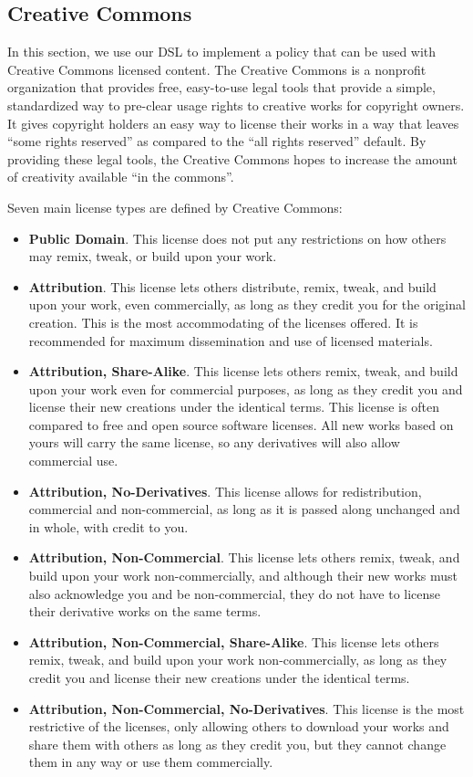 \subsection{Creative Commons}\label{sec:model-cc}
In this section, we use our DSL to implement a policy that can be used with
Creative Commons licensed content.  The Creative Commons is a nonprofit
organization that provides free, easy-to-use legal tools that provide a simple,
standardized way to pre-clear usage rights to creative works for copyright
owners.  It gives copyright holders an easy way to license their works in a way
that leaves ``some rights reserved'' as compared to the ``all rights reserved''
default.  By providing these legal tools, the Creative Commons hopes to
increase the amount of creativity available ``in the commons''.

Seven main license types are defined by Creative Commons:

\begin{itemize}
\item \textbf{Public Domain}. This license does not put any restrictions on how others may remix, tweak, or
build upon your work.
\item \textbf{Attribution}.  This license lets others distribute, remix, tweak, and build upon your work,
even commercially, as long as they credit you for the original creation. This
is the most accommodating of the licenses offered.  It is recommended for
maximum dissemination and use of licensed materials.
\item \textbf{Attribution, Share-Alike}.  This license lets others remix, tweak, and build upon your work even for
commercial purposes, as long as they credit you and license their new creations
under the identical terms.  This license is often compared to free and open
source software licenses.  All new works based on yours will carry the same
license, so any derivatives will also allow commercial use.
\item \textbf{Attribution, No-Derivatives}.  This license allows for redistribution, commercial and non-commercial, as long
as it is passed along unchanged and in whole, with credit to you.
\item \textbf{Attribution, Non-Commercial}.  This license lets others remix, tweak, and build upon your work
non-commercially, and although their new works must also acknowledge you and be
non-commercial, they do not have to license their derivative works on the same
terms.
\item \textbf{Attribution, Non-Commercial, Share-Alike}.  This license lets others remix, tweak, and build upon your work
non-commercially, as long as they credit you and license their new creations
under the identical terms.
\item \textbf{Attribution, Non-Commercial, No-Derivatives}.  This license is the most restrictive of the licenses, only allowing others to
download your works and share them with others as long as they credit you, but
they cannot change them in any way or use them commercially.
\end{itemize}

